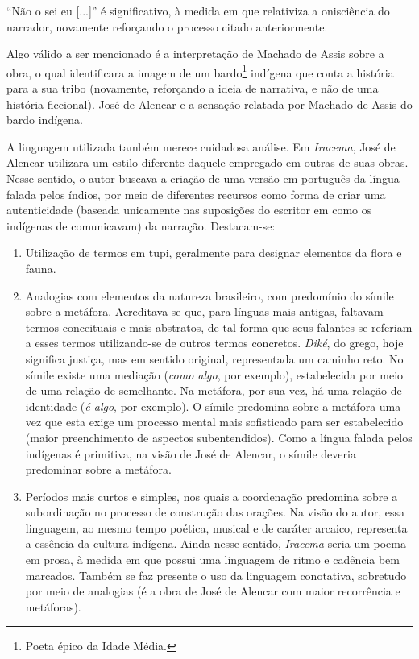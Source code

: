 ``Não o sei eu [...]'' é significativo, à medida em que relativiza a onisciência do narrador, novamente reforçando o processo citado anteriormente.

Algo válido a ser mencionado é a interpretação de Machado de Assis sobre a obra, o qual identificara a imagem de um bardo\footnote{Poeta épico da Idade Média.} indígena que conta a história para a sua tribo (novamente, reforçando a ideia de narrativa, e não de uma história ficcional). José de Alencar e a sensação relatada por Machado de Assis do bardo indígena.

A linguagem utilizada também merece cuidadosa análise. Em \textit{Iracema}, José de Alencar utilizara um estilo diferente daquele empregado em outras de suas obras. Nesse sentido, o autor buscava a criação de uma versão em português da língua falada pelos índios, por meio de diferentes recursos como forma de criar uma autenticidade (baseada unicamente nas suposições do escritor em como os indígenas de comunicavam) da narração. Destacam-se:

\begin{enumerate}
\item Utilização de termos em tupi, geralmente para designar elementos da flora e fauna.
\item Analogias com elementos da natureza brasileiro, com predomínio do símile sobre a metáfora. Acreditava-se que, para línguas mais antigas, faltavam termos conceituais e mais abstratos, de tal forma que seus falantes se referiam a esses termos utilizando-se de outros termos concretos. \textit{Diké}, do grego, hoje significa justiça, mas em sentido original, representada um caminho reto. No símile existe uma mediação (\textit{como algo}, por exemplo), estabelecida por meio de uma relação de semelhante. Na metáfora, por sua vez, há uma relação de identidade (\textit{é algo}, por exemplo). O símile predomina sobre a metáfora uma vez que esta exige um processo mental mais sofisticado para ser estabelecido (maior preenchimento de aspectos subentendidos). Como a língua falada pelos indígenas é primitiva, na visão de José de Alencar, o símile deveria predominar sobre a metáfora.
\item Períodos mais curtos e simples, nos quais a coordenação predomina sobre a subordinação no processo de construção das orações. Na visão do autor, essa linguagem, ao mesmo tempo poética, musical e de caráter arcaico, representa a essência da cultura indígena. Ainda nesse sentido, \textit{Iracema} seria um poema em prosa, à medida em que possui uma linguagem de ritmo e cadência bem marcados. Também se faz presente o uso da linguagem conotativa, sobretudo por meio de analogias (é a obra de José de Alencar com maior recorrência e metáforas).
\end{enumerate}

